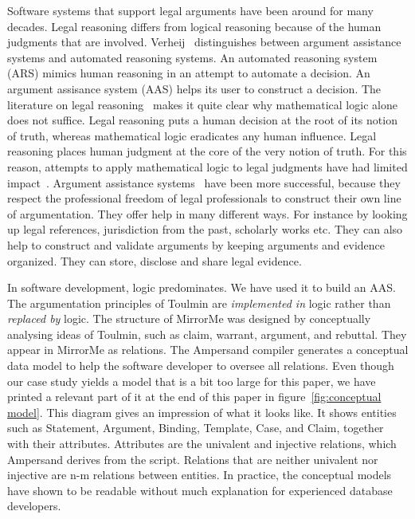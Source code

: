 \documentclass{elsarticle}
\begin{document}
	Software systems that support legal arguments have been around for many decades.
	Legal reasoning differs from logical reasoning because of the human judgments that are involved.
	Verheij~\cite{Verheij2003} distinguishes between argument assistance systems and automated reasoning systems.
	An automated reasoning system (ARS) mimics human reasoning in an attempt to automate a decision.
	An argument assisance system (AAS) helps its user to construct a decision.
	The literature on legal reasoning~\cite{Lind2007} makes it quite clear why mathematical logic alone does not suffice.
	Legal reasoning puts a human decision at the root of its notion of truth,
	whereas mathematical logic eradicates any human influence.
	Legal reasoning places human judgment at the core of the very notion of truth.
	For this reason, attempts to apply mathematical logic to legal judgments have had limited impact~\cite{Prakken2005}.
	Argument assistance systems~\cite{Verheij2005} have been more successful,
	because they respect the professional freedom of legal professionals to construct their own line of argumentation.
	They offer help in many different ways.
	For instance by looking up legal references, jurisdiction from the past, scholarly works etc.
	They can also help to construct and validate arguments by keeping arguments and evidence organized.
	They can store, disclose and share legal evidence.

	In software development, logic predominates.
	We have used it to build an AAS.
	The argumentation principles of Toulmin are \emph{implemented in} logic rather than \emph{replaced by} logic.
	The structure of MirrorMe was designed by conceptually analysing ideas of Toulmin,
	such as claim, warrant, argument, and rebuttal. They appear in MirrorMe as relations.
	The Ampersand compiler generates a conceptual data model
	to help the software developer to oversee all relations.
	Even though our case study yields a model that is a bit too large for this paper,
	we have printed a relevant part of it at the end of this paper in figure~\ref{fig:conceptual model}.
	This diagram gives an impression of what it looks like.
	It shows entities such as Statement, Argument, Binding, Template, Case, and Claim, together with their attributes.
	Attributes are the univalent and injective relations, which Ampersand derives from the script.
	Relations that are neither univalent nor injective are n-m relations between entities.
	In practice, the conceptual models have shown to be readable without much explanation for experienced database developers.
	
\end{document}
